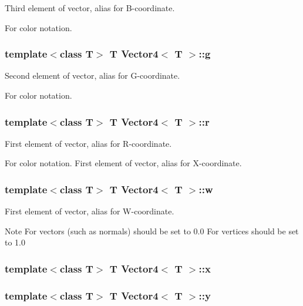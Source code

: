 Third element of vector, alias for B-\/coordinate. 

For color notation. \hypertarget{class_vector4_acd9cbf0e72286a325f50793cab3d94e0}{
\subsubsection[{g}]{\setlength{\rightskip}{0pt plus 5cm}template$<$class T$>$ T {\bf Vector4}$<$ T $>$::{\bf g}}}
\label{class_vector4_acd9cbf0e72286a325f50793cab3d94e0}


Second element of vector, alias for G-\/coordinate. 

For color notation. \hypertarget{class_vector4_add0f79fe4a8f6d4e1d2aadb2f0c9bbdd}{
\subsubsection[{r}]{\setlength{\rightskip}{0pt plus 5cm}template$<$class T$>$ T {\bf Vector4}$<$ T $>$::{\bf r}}}
\label{class_vector4_add0f79fe4a8f6d4e1d2aadb2f0c9bbdd}


First element of vector, alias for R-\/coordinate. 

For color notation. First element of vector, alias for X-\/coordinate. \hypertarget{class_vector4_a83daff43fa2b88b4e76474f4b9a45276}{
\subsubsection[{w}]{\setlength{\rightskip}{0pt plus 5cm}template$<$class T$>$ T {\bf Vector4}$<$ T $>$::{\bf w}}}
\label{class_vector4_a83daff43fa2b88b4e76474f4b9a45276}


First element of vector, alias for W-\/coordinate. 

\begin{DoxyNote}{Note}
For vectors (such as normals) should be set to 0.0 For vertices should be set to 1.0 
\end{DoxyNote}
\hypertarget{class_vector4_a2cedf20d2f695a4f0254681b13311ac9}{
\subsubsection[{x}]{\setlength{\rightskip}{0pt plus 5cm}template$<$class T$>$ T {\bf Vector4}$<$ T $>$::{\bf x}}}
\label{class_vector4_a2cedf20d2f695a4f0254681b13311ac9}
\hypertarget{class_vector4_aad001ba27515dc2dcb921e9c83596520}{
\subsubsection[{y}]{\setlength{\rightskip}{0pt plus 5cm}template$<$class T$>$ T {\bf Vector4}$<$ T $>$::{\bf y}}}
\label{class_vector4_aad001ba27515dc2dcb921e9c83596520}


